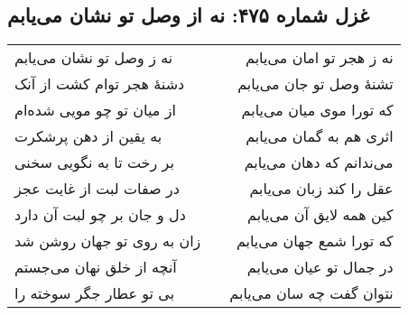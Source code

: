 \begin{center}
\section*{غزل شماره ۴۷۵: نه از وصل تو نشان می‌یابم}
\label{sec:475}
\begin{longtable}{l p{0.5cm} r}
نه ز وصل تو نشان می‌یابم
&&
نه ز هجر تو امان می‌یابم
\\
دشنهٔ هجر توام کشت از آنک
&&
تشنهٔ وصل تو جان می‌یابم
\\
از میان تو چو مویی شده‌ام
&&
که تورا موی میان می‌یابم
\\
به یقین از دهن پرشکرت
&&
اثری هم به گمان می‌یابم
\\
بر رخت تا به نگویی سخنی
&&
می‌ندانم که دهان می‌یابم
\\
در صفات لبت از غایت عجز
&&
عقل را کند زبان می‌یابم
\\
دل و جان بر چو لبت آن دارد
&&
کین همه لایق آن می‌یابم
\\
زان به روی تو جهان روشن شد
&&
که تورا شمع جهان می‌یابم
\\
آنچه از خلق نهان می‌جستم
&&
در جمال تو عیان می‌یابم
\\
بی تو عطار جگر سوخته را
&&
نتوان گفت چه سان می‌یابم
\\
\end{longtable}
\end{center}
